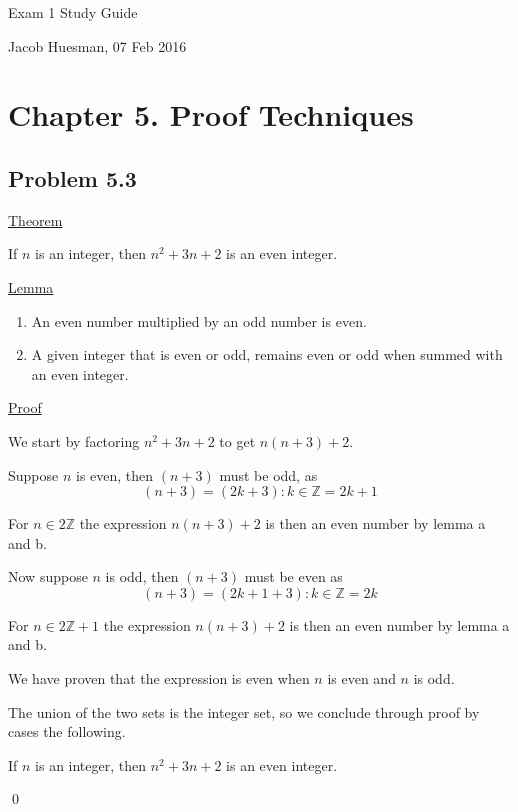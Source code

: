 \documentclass{article}
\begin{document}
\centerline{\sc \large Exam 1 Study Guide}
\vspace{.5pc}
\centerline{\sc Jacob Huesman, 07 Feb 2016}

\vspace{2pc}

\section{Chapter 5. Proof Techniques}
\subsection{Problem 5.3}
\underline{Theorem}
\begin{addmargin}[0.75cm]{0cm}
	If $n$ is an integer, then $n^2 + 3n + 2$ is an even integer.
\end{addmargin}

\underline{Lemma}
\renewcommand{\labelenumi}{(\alph{enumi})}
\begin{enumerate}[leftmargin=1.35cm]
	\item An even number multiplied by an odd number is even.
	\item A given integer that is even or odd, remains even or odd when summed with an even integer.
\end{enumerate}

\underline{Proof}
\begin{addmargin}[0.75cm]{0cm}
	We start by factoring $n^2 + 3n +2$ to get $n(n+3)+2$.
	
	Suppose $n$ is even, then $(n+3)$ must be odd, as 
	\begin{equation}
		(n+3)=(2k+3):k\in\mathbb{Z}=2k+1
	\end{equation}
	
	For $n \in 2\mathbb{Z}$ the expression $n(n+3)+2$ is then an even number by lemma a and b.
	
	Now suppose $n$ is odd, then $(n+3)$ must be even as 
	\begin{equation}
		(n+3)=(2k+1+3): k \in \mathbb{Z}=2k
	\end{equation}
	
	For $n \in 2\mathbb{Z}+1$ the expression $n(n+3)+2$ is then an even number by lemma a and b.
	
	We have proven that the expression is even when $n$ is even and $n$ is odd.
	
	The union of the two sets is the integer set, so we conclude through proof by cases the following.
	
	If $n$ is an integer, then $n^2 + 3n + 2$ is an even integer.
			
	\qed
\end{addmargin}
\end{document}
